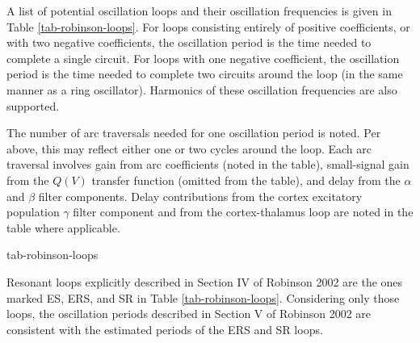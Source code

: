 A list of potential oscillation loops and their oscillation frequencies is
given in Table \ref{tab-robinson-loops}. For loops consisting entirely of
positive coefficients, or with two negative coefficients, the oscillation
period is the time needed to complete a single circuit. For loops with one
negative coefficient, the oscillation period is the time needed to complete
two circuits around the loop (in the same manner as a ring oscillator).
Harmonics of these oscillation frequencies are also supported.

The number of arc traversals needed for one oscillation period is noted.
Per above, this may reflect either one or two cycles around the loop. Each
arc traversal involves gain from arc coefficients (noted in the table),
small-signal gain from the $Q(V)$ transfer function (omitted from the table),
and delay from the $\alpha$ and $\beta$ filter components. Delay
contributions from the cortex excitatory population $\gamma$ filter
component and from the cortex-thalamus loop are noted in the table where
applicable.

{tab-robinson-loops}

Resonant loops explicitly described in Section IV of Robinson 2002 are the
ones marked ES, ERS, and SR in Table \ref{tab-robinson-loops}. Considering
only those loops, the oscillation periods described in Section V of
Robinson 2002 are consistent with the estimated periods of the ERS and
SR loops.

